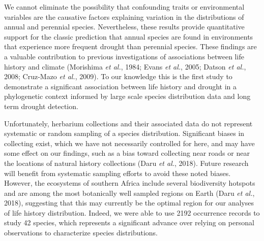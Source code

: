 \documentclass[man,floatsintext]{apa6}
\theoremstyle{definition}
\theoremstyle{definition}
\theoremstyle{definition}
\theoremstyle{remark}
\begin{document}
We cannot eliminate the possibility that confounding traits or
environmental variables are the causative factors explaining variation
in the distributions of annual and perennial species. Nevertheless,
these results provide quantitative support for the classic prediction
that annual species are found in environments that experience more
frequent drought than perennial species. These findings are a valuable
contribution to previous investigations of associations between life
history and climate (Morishima \emph{et al.}, 1984; Evans \emph{et al.},
2005; Datson \emph{et al.}, 2008; Cruz-Mazo \emph{et al.}, 2009). To our
knowledge this is the first study to demonstrate a significant
association between life history and drought in a phylogenetic context
informed by large scale species distribution data and long term drought
detection.

Unfortunately, herbarium collections and their associated data do not
represent systematic or random sampling of a species distribution.
Significant biases in collecting exist, which we have not necessarily
controlled for here, and may have some effect on our findings, such as a
bias toward collecting near roads or near the locations of natural
history collections (Daru \emph{et al.}, 2018). Future research will
benefit from systematic sampling efforts to avoid these noted biases.
However, the ecosystems of southern Africa include several biodiversity
hotspots and are among the most botanically well sampled regions on
Earth (Daru \emph{et al.}, 2018), suggesting that this may currently be
the optimal region for our analyses of life history distribution.
Indeed, we were able to use 2192 occurrence records to study 42 species,
which represents a significant advance over relying on personal
observations to characterize species distributions.
\end{document}

